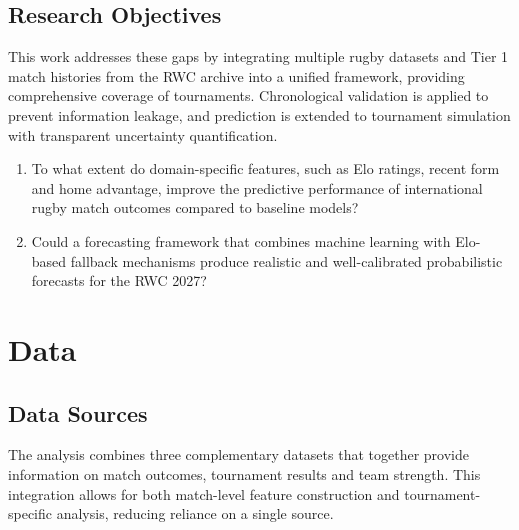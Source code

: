\documentclass[12pt,a4paper,onecolumn]{article}
\begin{document}
\subsection{Research Objectives}
This work addresses these gaps by integrating multiple rugby datasets and Tier 1 match histories from the RWC archive into a unified framework, providing comprehensive coverage of tournaments. Chronological validation is applied to prevent information leakage, and prediction is extended to tournament simulation with transparent uncertainty quantification.

\vspace{0.25cm}

\begin{enumerate}[label=\textbf{RQ\arabic*.}, leftmargin=1.5cm, itemsep=1.5em, parsep=0.25em]
  \item To what extent do domain-specific features, such as Elo ratings, recent form and home advantage, improve the predictive performance of international rugby match outcomes compared to baseline models?
  
  \item Could a forecasting framework that combines machine learning with Elo-based fallback mechanisms produce realistic and well-calibrated probabilistic forecasts for the RWC 2027?
\end{enumerate}

\newpage
\section{Data}

\subsection{Data Sources}

The analysis combines three complementary datasets that together provide information on match outcomes, tournament results and team strength. This integration allows for both match-level feature construction and tournament-specific analysis, reducing reliance on a single source.
\end{document}
